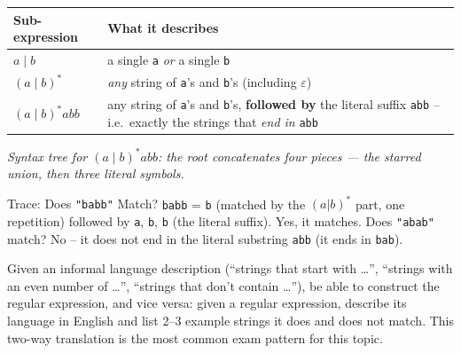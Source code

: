 \documentclass[full-course-notes.tex]{subfiles}
\begin{document}
\begin{center}
\renewcommand{\arraystretch}{1.3}
\begin{tabularx}{\textwidth}{@{}l X@{}}
\toprule
\textbf{Sub-expression} & \textbf{What it describes} \\
\midrule
$a \mid b$ & a single \texttt{a} \emph{or} a single \texttt{b} \\
$(a \mid b)^{*}$ & \emph{any} string of \texttt{a}'s and \texttt{b}'s (including $\varepsilon$) \\
$(a \mid b)^{*}abb$ & any string of \texttt{a}'s and \texttt{b}'s, \textbf{followed by} the
literal suffix \texttt{abb} -- i.e.\ exactly the strings that \emph{end in} \texttt{abb} \\
\bottomrule
\end{tabularx}
\end{center}

\begin{center}
\end{center}
\begin{center}
\small\textit{Syntax tree for $(a\mid b)^{*}abb$: the root concatenates four pieces --- the
starred union, then three literal symbols.}
\end{center}

\begin{examplebox}{Trace: Does \texttt{"babb"} Match?}
\texttt{babb} = \texttt{b} (matched by the $(a|b)^*$ part, one repetition) followed by
\texttt{a}, \texttt{b}, \texttt{b} (the literal suffix). Yes, it matches. Does \texttt{"abab"}
match? No -- it does not end in the literal substring \texttt{abb} (it ends in \texttt{bab}).
\end{examplebox}

\begin{examfocus}
Given an informal language description (``strings that start with \dots'', ``strings with an
even number of \dots'', ``strings that don't contain \dots''), be able to construct the regular
expression, and vice versa: given a regular expression, describe its language in English and
list 2--3 example strings it does and does not match. This two-way translation is the most
common exam pattern for this topic.
\end{examfocus}
\end{document}
